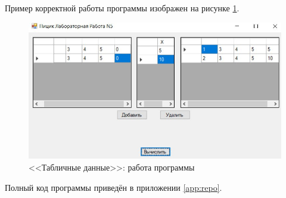Пример корректной работы программы изображен на рисунке \ref{fig:dgv_result}. 
\begin{figure}[H]
    \centering
    \includegraphics[scale=0.68]{../img/dgv/dgv_result.png}
    \caption{<<Табличные данные>>: работа программы}
    \label{fig:dgv_result}
\end{figure}

Полный код программы приведён в приложении \ref{app:repo}. 